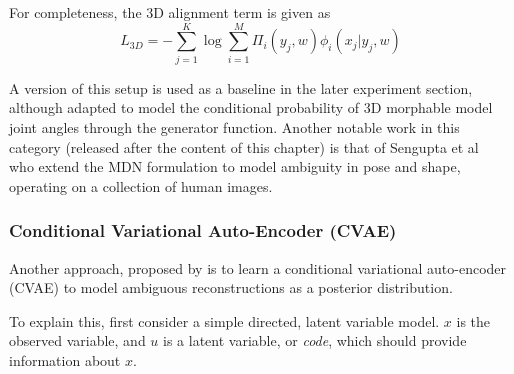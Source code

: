 For completeness, the 3D alignment term is given as
\begin{equation}
  L_{3D} = -\sum_{j=1}^{K} \log \sum_{i=1}^{M} \Pi_{i}(y_{j}, w) \phi_{i}(x_j | y_j, w)
\end{equation}

A version of this setup is used as a baseline in the later experiment section, although adapted to model the conditional probability of 3D morphable model joint angles through the generator function. Another notable work in this category (released after the content of this chapter) is that of Sengupta et al~ who extend the MDN formulation to model ambiguity in pose and shape, operating on a collection of human images. 

\subsubsection{Conditional Variational Auto-Encoder (CVAE)}

Another approach, proposed by \citet{sharma19monocular} is to learn a conditional variational auto-encoder (CVAE) to model ambiguous reconstructions as a posterior distribution. 

To explain this, first consider a simple directed, latent variable model. $x$ is the observed variable, and $u$ is a latent variable, or \emph{code}, which should provide information about $x$.


\begin{center}
  \end{center}

